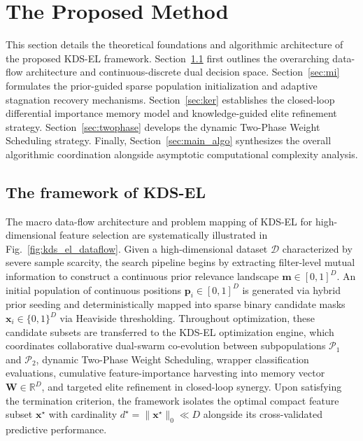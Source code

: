\section{The Proposed Method}\label{sec:proposed}

This section details the theoretical foundations and algorithmic architecture of the proposed KDS-EL framework. Section~\ref{sec:framework} first outlines the overarching data-flow architecture and continuous-discrete dual decision space. Section~\ref{sec:mi} formulates the prior-guided sparse population initialization and adaptive stagnation recovery mechanisms. Section~\ref{sec:ker} establishes the closed-loop differential importance memory model and knowledge-guided elite refinement strategy. Section~\ref{sec:twophase} develops the dynamic Two-Phase Weight Scheduling strategy. Finally, Section~\ref{sec:main_algo} synthesizes the overall algorithmic coordination alongside asymptotic computational complexity analysis.

\subsection{The framework of KDS-EL}\label{sec:framework}

The macro data-flow architecture and problem mapping of KDS-EL for high-dimensional feature selection are systematically illustrated in Fig.~\ref{fig:kds_el_dataflow}. Given a high-dimensional dataset $\mathcal{D}$ characterized by severe sample scarcity, the search pipeline begins by extracting filter-level mutual information to construct a continuous prior relevance landscape $\mathbf{m} \in [0, 1]^D$. An initial population of continuous positions $\mathbf{p}_i \in [0, 1]^D$ is generated via hybrid prior seeding and deterministically mapped into sparse binary candidate masks $\mathbf{x}_i \in \{0, 1\}^D$ via Heaviside thresholding. Throughout optimization, these candidate subsets are transferred to the KDS-EL optimization engine, which coordinates collaborative dual-swarm co-evolution between subpopulations $\mathcal{P}_1$ and $\mathcal{P}_2$, dynamic Two-Phase Weight Scheduling, wrapper classification evaluations, cumulative feature-importance harvesting into memory vector $\mathbf{W} \in \mathbb{R}^D$, and targeted elite refinement in closed-loop synergy. Upon satisfying the termination criterion, the framework isolates the optimal compact feature subset $\mathbf{x}^{\star}$ with cardinality $d^{\star} = \|\mathbf{x}^{\star}\|_0 \ll D$ alongside its cross-validated predictive performance.


